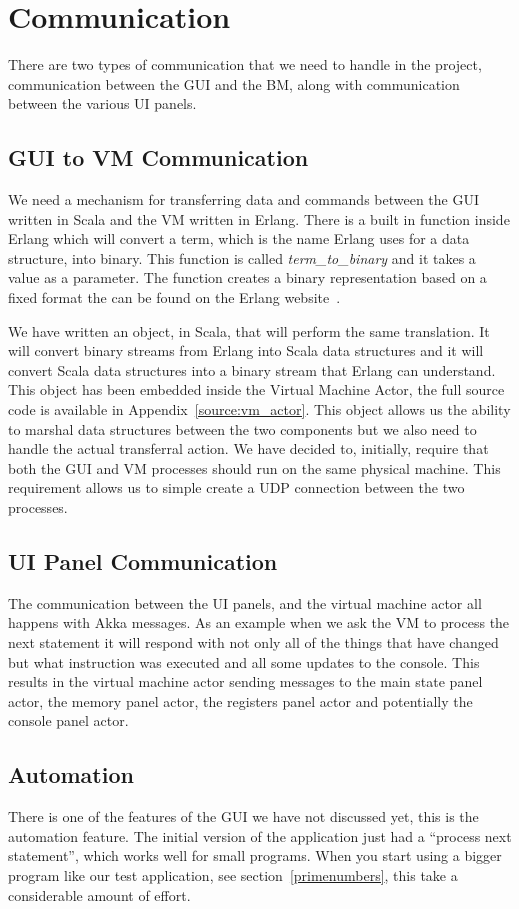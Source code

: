 \documentclass[a4paper,11pt]{report}
\begin{document}
\section{Communication}
There are two types of communication that we need to handle in the project, communication between the GUI and the BM, along with communication between the various UI panels.
\subsection{GUI to VM Communication}
We need a mechanism for transferring data and commands between the GUI written in Scala and the VM written in Erlang. There is a built in function inside Erlang which will convert a term, which is the name Erlang uses for a data structure, into binary. This function is called \textit{term\_to\_binary} and it takes a value as a parameter. The function creates a binary representation based on a fixed format the can be found on the Erlang website~\cite{term_to_binary}.

We have written an object, in Scala, that will perform the same translation. It will convert binary streams from Erlang into Scala data structures and it will convert Scala data structures into a binary stream that Erlang can understand. This object has been embedded inside the Virtual Machine Actor, the full source code is available in Appendix~\ref{source:vm_actor}.
\clearpage
This object allows us the ability to marshal data structures between the two components but we also need to handle the actual transferral action. We have decided to, initially, require that both the GUI and VM processes should run on the same physical machine. This requirement allows us to simple create a UDP connection between the two processes.
\subsection{UI Panel Communication}
The communication between the UI panels, and the virtual machine actor all happens with Akka messages. As an example when we ask the VM to process the next statement it will respond with not only all of the things that have changed but what instruction was executed and all some updates to the console. This results in the virtual machine actor sending messages to the main state panel actor, the memory panel actor, the registers panel actor and potentially the console panel actor.
\subsection{Automation}
There is one of the features of the GUI we have not discussed yet, this is the automation feature. The initial version of the application just had a ``process next statement'', which works well for small programs. When you start using a bigger program like our test application, see section~\ref{primenumbers}, this take a considerable amount of effort.
\end{document}
